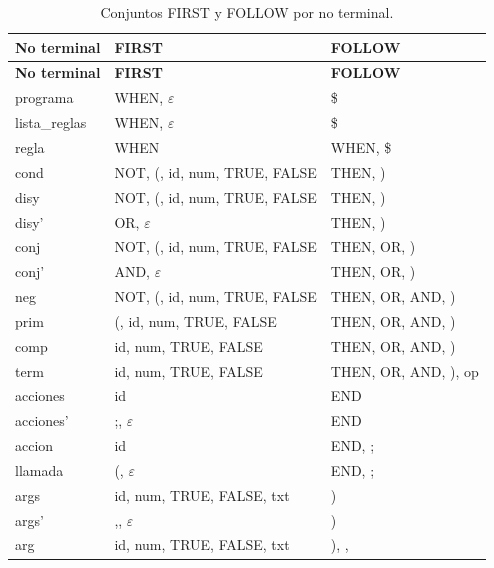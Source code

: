 {\small\setlength{\tabcolsep}{4pt}\begin{longtable}{L{2.8cm}L{6.3cm}L{5.9cm}}
\caption{Conjuntos FIRST y FOLLOW por no terminal.}\label{tab:firstfollow}\\
\toprule\textbf{No terminal}&\textbf{FIRST}&\textbf{FOLLOW}\\\midrule\endfirsthead
\toprule\textbf{No terminal}&\textbf{FIRST}&\textbf{FOLLOW}\\\midrule\endhead
programa&{WHEN, $\varepsilon$}&{\$}\\
lista\_reglas&{WHEN, $\varepsilon$}&{\$}\\
regla&{WHEN}&{WHEN, \$}\\
cond&{NOT, (, id, num, TRUE, FALSE}&{THEN, )}\\
disy&{NOT, (, id, num, TRUE, FALSE}&{THEN, )}\\
disy'&{OR, $\varepsilon$}&{THEN, )}\\
conj&{NOT, (, id, num, TRUE, FALSE}&{THEN, OR, )}\\
conj'&{AND, $\varepsilon$}&{THEN, OR, )}\\
neg&{NOT, (, id, num, TRUE, FALSE}&{THEN, OR, AND, )}\\
prim&{(, id, num, TRUE, FALSE}&{THEN, OR, AND, )}\\
comp&{id, num, TRUE, FALSE}&{THEN, OR, AND, )}\\
term&{id, num, TRUE, FALSE}&{THEN, OR, AND, ), op}\\
acciones&{id}&{END}\\
acciones'&{;, $\varepsilon$}&{END}\\
accion&{id}&{END, ;}\\
llamada&{(, $\varepsilon$}&{END, ;}\\
args&{id, num, TRUE, FALSE, txt}&{)}\\
args'&{,, $\varepsilon$}&{)}\\
arg&{id, num, TRUE, FALSE, txt}&{), ,}\\
\bottomrule\end{longtable}}
